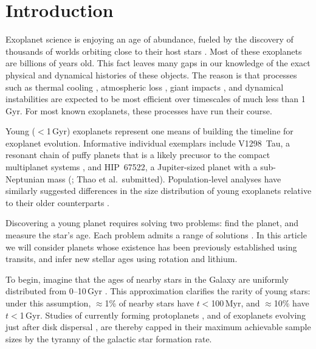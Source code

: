 \documentclass[11pt,twocolumn,tighten]{aastex63}
\begin{document}

\section{Introduction}
\label{sec:intro}

Exoplanet science is enjoying an age of abundance, fueled by the
discovery of thousands of worlds orbiting close to their host stars
\citep{Borucki10,2015JATIS...1a4003R}.  Most of these exoplanets are
billions of years old.  This fact leaves many gaps in our knowledge of
the exact physical and dynamical histories of these objects.  The
reason is that processes such as thermal cooling
\citep{2007ApJ...659.1661F}, atmospheric loss
\citep{2019AREPS..47...67O}, giant impacts
\citep{2014prpl.conf..595R}, and dynamical instabilities
\citep{2017MNRAS.470.1750I} are expected to be most efficient over
timescales of much less than 1\,Gyr.  For most known exoplanets, these
processes have run their course.

Young ($<$1\,Gyr) exoplanets represent one means of building
the timeline for exoplanet evolution.  Informative individual
exemplars include V1298~Tau, a resonant chain of 
puffy planets that is a likely precusor to the compact
multiplanet systems \citep{David_2019}, and HIP~67522, a Jupiter-sized
planet with a sub-Neptunian mass (\citealt{Rizzuto_2020}; Thao et
al.~submitted).  Population-level analyses have similarly suggested
differences in the size distribution of young exoplanets relative to
their older counterparts
\citep{Berger_2020b_rpage,David_2021,Sandoval_2021,2023AJ....166..248C,2024arXiv240303261V}.

Discovering a young planet requires solving two problems: find the
planet, and measure the star's age.  Each problem admits a range of
solutions
\citep[e.g.][]{2008Sci...322.1348M,2012ApJ...756L..33Q,2024AJ....167..193T}.
In this article we will consider planets whose existence has been
previously established using transits, and infer new stellar ages
using rotation and lithium.

To begin, imagine that the ages of nearby stars in the Galaxy are
uniformly distributed from 0--10\,Gyr
\citep[][]{2000MNRAS.318..658B,Nordstrom_2004}.  This approximation
clarifies the rarity of young stars: under this assumption,
$\approx$1\% of nearby stars have $t$$<$100\,Myr, and $\approx$10\%
have $t$$<$1\,Gyr.  Studies of currently forming protoplanets
\citep{2018A&A...617A..44K}, and of exoplanets evolving just after
disk dispersal \citep[e.g.][]{2022MNRAS.512.5067K}, are thereby capped
in their maximum achievable sample sizes by the tyranny of the
galactic star formation rate.
\end{document}
